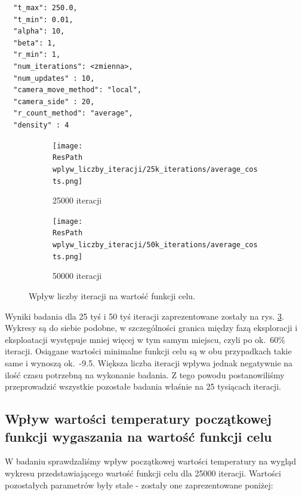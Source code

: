 \documentclass[12pt,a4paper]{article}
\newcommand{\ResPath}{../badania/}
\begin{document}
\begin{lstlisting}
  "t_max": 250.0,
  "t_min": 0.01,
  "alpha": 10,
  "beta": 1,
  "r_min": 1,
  "num_iterations": <zmienna>,
  "num_updates" : 10,
  "camera_move_method": "local",
  "camera_side" : 20,
  "r_count_method": "average",
  "density" : 4
\end{lstlisting}
\begin{figure}[htb]
  \begin{subfigure}[b]{0.5\linewidth}
    \centering
    \texttt{[image: \\ResPath wplyw\_liczby\_iteracji/25k\_iterations/average\_costs.png]}
    \caption{25000 iteracji}
    \label{fig_iterations:a}
    \vspace{2ex}
  \end{subfigure}%
  \begin{subfigure}[b]{0.5\linewidth}
    \texttt{[image: \\ResPath wplyw\_liczby\_iteracji/50k\_iterations/average\_costs.png]}
    \caption{50000 iteracji}
    \label{fig_iterations:b}
    \vspace{2ex}
  \end{subfigure}
  \caption{Wpływ liczby iteracji na wartość funkcji celu.}
  \label{fig_iterations}
\end{figure}
Wyniki badania dla 25 tyś i 50 tyś iteracji zaprezentowane zostały na rys. \ref{fig_iterations}. Wykresy są do siebie podobne, w szczególności granica między
fazą eksploracji i eksploatacji występuje mniej więcej w tym samym miejscu, czyli
po ok.\ 60\% iteracji. Osiągane wartości minimalne funkcji celu są w obu
przypadkach takie same i wynoszą ok.\ -9.5. Większa liczba iteracji wpływa jednak
negatywnie na ilość czasu potrzebną na wykonanie badania. Z tego powodu
postanowiliśmy przeprowadzić wszystkie pozostałe badania właśnie na 25 tysiącach iteracji.

\subsection{Wpływ wartości temperatury początkowej funkcji wygaszania na wartość
funkcji celu}
W badaniu sprawdzaliśmy wpływ początkowej wartości temperatury na wygląd wykresu
przedstawiającego wartość funkcji celu dla 25000 iteracji. Wartości pozostałych
parametrów były stałe - zostały one zaprezentowane poniżej:
\end{document}
